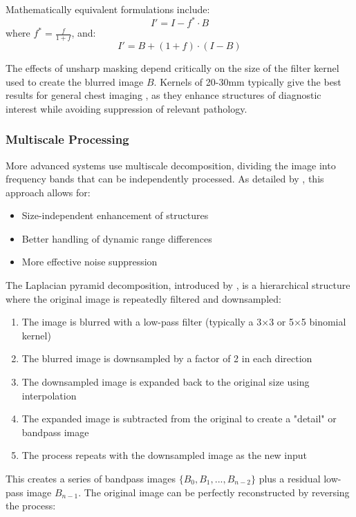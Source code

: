 \documentclass[nomenclature, english, bibtex]{kththesis}
\numberwithin{listing}{chapter}
\begin{document}
Mathematically equivalent formulations include:
\begin{equation}
I' = I - f^* \cdot B
\end{equation}
where $f^* = \frac{f}{1+f}$, and:
\begin{equation}
I' = B + (1+f) \cdot (I - B)
\end{equation}

The effects of unsharp masking depend critically on the size of the filter kernel used to create the blurred image $B$. Kernels of 20-30mm typically give the best results for general chest imaging \cite{prokop1993improved}, as they enhance structures of diagnostic interest while avoiding suppression of relevant pathology.

\subsubsection{Multiscale Processing}
More advanced systems use multiscale decomposition, dividing the image into frequency bands that can be independently processed. As detailed by \cite{stahl2000digital}, this approach allows for:
\begin{itemize}
    \item Size-independent enhancement of structures
    \item Better handling of dynamic range differences
    \item More effective noise suppression
\end{itemize}

The Laplacian pyramid decomposition, introduced by \cite{burt1983laplacian}, is a hierarchical structure where the original image is repeatedly filtered and downsampled:

\begin{enumerate}
    \item The image is blurred with a low-pass filter (typically a 3×3 or 5×5 binomial kernel)
    \item The blurred image is downsampled by a factor of 2 in each direction
    \item The downsampled image is expanded back to the original size using interpolation
    \item The expanded image is subtracted from the original to create a "detail" or bandpass image
    \item The process repeats with the downsampled image as the new input
\end{enumerate}

This creates a series of bandpass images $\{B_0, B_1, ..., B_{n-2}\}$ plus a residual low-pass image $B_{n-1}$. The original image can be perfectly reconstructed by reversing the process:
\end{document}
